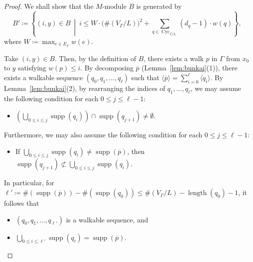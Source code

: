 \documentclass[ALCO,published]{cedram}
\theoremstyle{remark}
\begin{document}
\begin{proof}
We shall show that the $M$-module $B$ is generated by 
\[
B' \coloneqq  \left \{ (i,y) \in B \ \middle | \ i \le W \cdot \bigl( \# (V_{\Gamma}/L) \bigr)^2 
    + \sum _{q \in \operatorname{Cyc}_{\Gamma /L}} (d_q - 1) \cdot w(q) \right\}, 
\]
where $W \coloneqq  \max _{e \in E_{\Gamma}} w(e)$. 

Take $(i,y) \in B$. 
Then, by the definition of $B$, there exists a walk $p$ in $\Gamma$ from $x_0$ to $y$ satisfying $w(p) \le i$. 
By decomposing $\overline{p}$ (Lemma~\ref{lem:bunkai}(1)), 
there exists a walkable sequence $(q_0, q_1, \ldots, q_{\ell})$ such that 
$\langle \overline{p} \rangle = \sum _{i=0} ^{\ell} \langle q_i \rangle$. 
By Lemma~\ref{lem:bunkai}(2), by rearranging the indices of $q_1, \ldots, q_{\ell}$, 
we may assume the following condition for each $0 \le j \le \ell -1$: 
\begin{itemize}
\item 
$\left( \bigcup _{0 \le i \le j} \operatorname{supp}(q_i) \right) \cap \operatorname{supp}(q_{j+1}) \not = \emptyset$. 
\end{itemize}
Furthermore, we may also assume the following condition for each $0 \le j \le \ell -1$:
\begin{itemize}
\item
If $\bigcup _{0 \le i \le j} \operatorname{supp}(q_i) \not = \operatorname{supp}(\overline{p})$, then 
$\operatorname{supp}(q_{j+1}) \not \subset \bigcup _{0 \le i \le j} \operatorname{supp}(q_i)$. 
\end{itemize}
In particular, for $\ell' \coloneqq  \#(\operatorname{supp}(\overline{p})) - \#(\operatorname{supp}(q_0)) 
\le \# (V_{\Gamma}/L) - \operatorname{length}(q_0) - 1$, 
it follows that 
\begin{itemize}
\item $(q_0, q_1, \ldots, q_{\ell'})$ is a walkable sequence, and 
\item $\bigcup _{0 \le i \le \ell'} \operatorname{supp}(q_i) = \operatorname{supp}(\overline{p})$. 
\end{itemize}


\end{proof}
\end{document}
